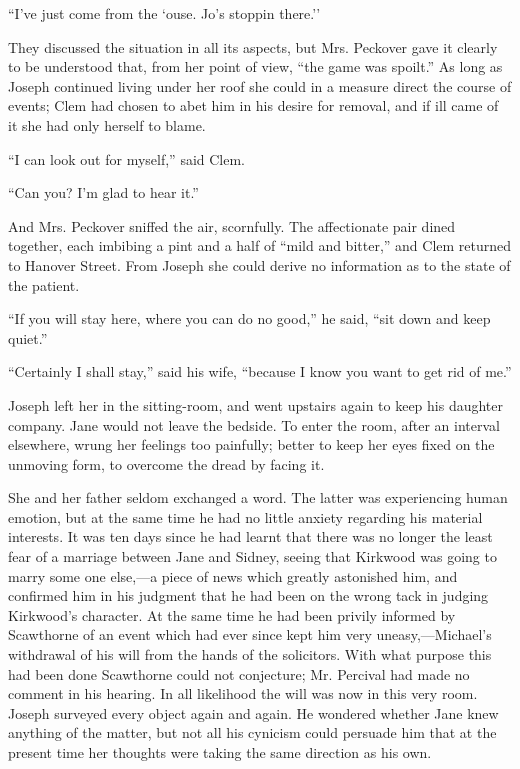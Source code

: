 ``I've just come from the `ouse. Jo's stoppin there.''

They discussed the situation in all its
{\protect\hypertarget{167}{}{}}aspects, but Mrs. Peckover gave it
clearly to be understood that, from her point of view, ``the game was
spoilt.'' As long as Joseph continued living under her roof she could in
a measure direct the course of events; Clem had chosen to abet him in
his desire for removal, and if ill came of it she had only herself to
blame.

``I can look out for myself,'' said Clem.

``Can you? I'm glad to hear it.''

And Mrs. Peckover sniffed the air, scornfully. The affectionate pair
dined together, each imbibing a pint and a half of ``mild and bitter,''
and Clem returned to Hanover Street. From Joseph she could derive no
information as to the state of the patient.

``If you will stay here, where you can do no good,'' he said, ``sit down
and keep quiet.''

``Certainly I shall stay,'' said his wife, ``because I know you want to
get rid of me.''

Joseph left her in the sitting-room, and went upstairs again to keep his
daughter company. Jane would not leave the bedside. To enter the room,
after an interval elsewhere, wrung her feelings too painfully; better to
keep her eyes fixed on the unmoving form, to overcome the dread by
facing it.

{\protect\hypertarget{168}{}{}}She and her father seldom exchanged a
word. The latter was experiencing human emotion, but at the same time he
had no little anxiety regarding his material interests. It was ten days
since he had learnt that there was no longer the least fear of a
marriage between Jane and Sidney, seeing that Kirkwood was going to
marry some one else,---a piece of news which greatly astonished him, and
confirmed him in his judgment that he had been on the wrong tack in
judging Kirkwood's character. At the same time he had been privily
informed by Scawthorne of an event which had ever since kept him very
uneasy,---Michael's withdrawal of his will from the hands of the
solicitors. With what purpose this had been done Scawthorne could not
conjecture; Mr. Percival had made no comment in his hearing. In all
likelihood the will was now in this very room. Joseph surveyed every
object again and again. He wondered whether Jane knew anything of the
matter, but not all his cynicism could persuade him that at the present
time her thoughts were taking the same direction as his own.

